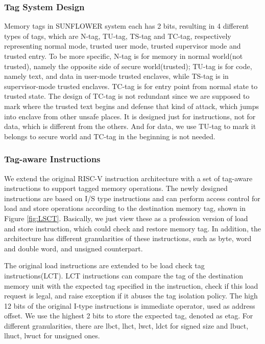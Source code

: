 \documentclass[conference]{IEEEtran}
\begin{document}
\subsubsection{Tag System Design}
Memory tags in SUNFLOWER system each has 2 bits, resulting in 4 different types of tags, which are N-tag, TU-tag, TS-tag and TC-tag, respectively representing normal mode, trusted user mode, trusted supervisor mode and trusted entry. To be more specific, N-tag is for memory in normal world(not trusted), namely the opposite side of secure world(trusted); TU-tag is for code, namely text, and data in user-mode trusted enclaves, while TS-tag is in supervisor-mode trusted enclaves. TC-tag is for entry point from normal state to trusted state. The design of TC-tag is not redundant since we are supposed to mark where the trusted text begins and defense that kind of attack, which jumps into enclave from other unsafe places. It is designed just for instructions, not for data, which is different from the others. And for data, we use TU-tag to mark it belongs to secure world and TC-tag in the beginning is not needed.

\subsubsection{Tag-aware Instructions}
We extend the original RISC-V instruction architecture with a set of tag-aware instructions to support tagged memory operations. The newly designed instructions are based on I/S type instructions and can perform access control for load and store operations according to the destination memory tag, shown in Figure \ref{fig:LSCT}. Basically, we just view these as a profession version of load and store instruction, which could check and restore memory tag. In addition, the architecture has different granularities of these instructions, such as byte, word and double word, and unsigned counterpart.

The original load instructions are extended to be load check tag instructions(LCT). LCT instructions can compare the tag of the destination memory unit with the expected tag specified in the instruction, check if this load request is legal, and raise exception if it abuses the tag isolation policy. The high 12 bits of the original I-type instructions is immediate operator, used as address offset. We use the highest 2 bits to store the expected tag, denoted as etag. For different granularities, there are lbct, lhct, lwct, ldct for signed size and lbuct, lhuct, lwuct for unsigned ones.
\end{document}
